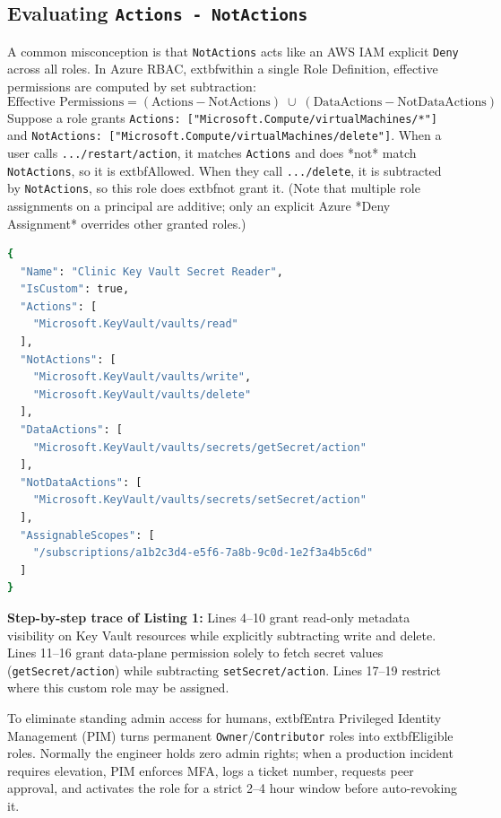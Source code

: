 \subsection{Evaluating \texttt{Actions - NotActions}}
A common misconception is that \texttt{NotActions} acts like an AWS IAM explicit \texttt{Deny} across all roles. In Azure RBAC, 	extbf{within a single Role Definition}, effective permissions are computed by set subtraction:
\begin{equation}
\text{Effective Permissions} = (\text{Actions} - \text{NotActions}) \;\cup\; (\text{DataActions} - \text{NotDataActions})
\end{equation}
Suppose a role grants \texttt{Actions: ["Microsoft.Compute/virtualMachines/*"]} and \texttt{NotActions: ["Microsoft.Compute/virtualMachines/delete"]}. When a user calls \texttt{.../restart/action}, it matches \texttt{Actions} and does *not* match \texttt{NotActions}, so it is 	extbf{Allowed}. When they call \texttt{.../delete}, it is subtracted by \texttt{NotActions}, so this role does 	extbf{not} grant it. (Note that multiple role assignments on a principal are additive; only an explicit Azure *Deny Assignment* overrides other granted roles.)

\begin{lstlisting}[language=bash, caption={Custom Least-Privilege Azure RBAC Role Definition (JSON)}]
{
  "Name": "Clinic Key Vault Secret Reader",
  "IsCustom": true,
  "Actions": [
    "Microsoft.KeyVault/vaults/read"
  ],
  "NotActions": [
    "Microsoft.KeyVault/vaults/write",
    "Microsoft.KeyVault/vaults/delete"
  ],
  "DataActions": [
    "Microsoft.KeyVault/vaults/secrets/getSecret/action"
  ],
  "NotDataActions": [
    "Microsoft.KeyVault/vaults/secrets/setSecret/action"
  ],
  "AssignableScopes": [
    "/subscriptions/a1b2c3d4-e5f6-7a8b-9c0d-1e2f3a4b5c6d"
  ]
}
\end{lstlisting}

\textbf{Step-by-step trace of Listing 1:} Lines 4--10 grant read-only metadata visibility on Key Vault resources while explicitly subtracting write and delete. Lines 11--16 grant data-plane permission solely to fetch secret values (\texttt{getSecret/action}) while subtracting \texttt{setSecret/action}. Lines 17--19 restrict where this custom role may be assigned.

To eliminate standing admin access for humans, 	extbf{Entra Privileged Identity Management (PIM)} turns permanent \texttt{Owner}/\texttt{Contributor} roles into 	extbf{Eligible} roles. Normally the engineer holds zero admin rights; when a production incident requires elevation, PIM enforces MFA, logs a ticket number, requests peer approval, and activates the role for a strict 2--4 hour window before auto-revoking it.

